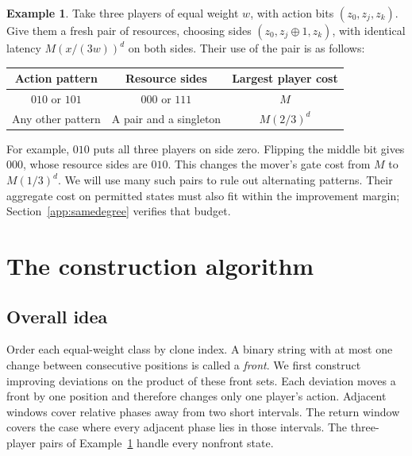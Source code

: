 \documentclass[11pt]{article}
\theoremstyle{definition}
\newtheorem{example}[theorem]{Example}
\newcommand{\xor}{\mathbin{\oplus}}
\begin{document}
\begin{example}\label{ex:gate}
Take three players of equal weight $w$, with action bits $(z_0,z_j,z_k)$. Give them a fresh pair of resources, choosing sides $(z_0,z_j\xor1,z_k)$, with identical latency $M(x/(3w))^d$ on both sides. Their use of the pair is as follows:
\begin{center}
\begin{tabular}{@{}ccc@{}}
\toprule
Action pattern & Resource sides & Largest player cost\\
\midrule
$010$ or $101$ & $000$ or $111$ & $M$\\
Any other pattern & A pair and a singleton & $M(2/3)^d$\\
\bottomrule
\end{tabular}
\end{center}
For example, $010$ puts all three players on side zero. Flipping the middle bit gives $000$, whose resource sides are $010$. This changes the mover's gate cost from $M$ to $M(1/3)^d$. We will use many such pairs to rule out alternating patterns. Their aggregate cost on permitted states must also fit within the improvement margin; Section~\ref{app:samedegree} verifies that budget.
\end{example}

\section{The construction algorithm}\label{sec:application}
\subsection{Overall idea}
Order each equal-weight class by clone index. A binary string with at most one change between consecutive positions is called a \emph{front}. We first construct improving deviations on the product of these front sets. Each deviation moves a front by one position and therefore changes only one player's action. Adjacent windows cover relative phases away from two short intervals. The return window covers the case where every adjacent phase lies in those intervals. The three-player pairs of Example~\ref{ex:gate} handle every nonfront state.
\end{document}
